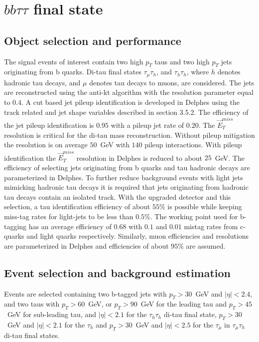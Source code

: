 \section{$bb\tau\tau$ final state}

\subsection{Object selection and performance}
The signal events of interest contain two high $p_{T}$ taus and two high $p_{T}$ jets originating from b quarks. Di-tau final states $\tau_{\mu}\tau_{h}$, and $\tau_{h}\tau_{h}$, where $h$ denotes hadronic tau decays, and $\mu$ denotes tau decays to muons, are considered.
The jets are reconstructed using the anti-kt algorithm with the resolution parameter equal to $0.4$. A cut based jet pileup identification is developed in Delphes using the track related and jet shape variables described in section 3.5.2. The efficiency of the jet pileup identification is $0.95$ with a pileup jet rate of $0.20$. The $\vec{E}_{T}^{miss}$ resolution is critical for the di-tau mass reconstruction. Without pileup mitigation the resolution is on average $50$~GeV with $140$ pileup interactions. With pileup identification the  $\vec{E}_{T}^{miss}$ resolution in Delphes is reduced to about $25$~GeV. 
The efficiency of selecting jets originating from b quarks and tau hadronic decays are parameterized in Delphes. To further reduce background events with light jets mimicking hadronic
tau decays it is required that jets originating from hadronic tau decays contain an isolated track. With the upgraded \phasetwo detector and this selection, a tau identification efficiency of about $55\%$ is possible while keeping miss-tag rates for light-jets to be less than $0.5\%$. The working point used for b-tagging has an average efficiency of $0.68$ with $0.1$ and $0.01$ mistag rates from c-quarks and light quarks respectively.  Similarly, muon efficiencies and resolutions are parameterized in Delphes and efficiencies of about $95\%$ are assumed.

\subsection{Event selection and background estimation}
Events are selected containing two b-tagged jets with $p_{T}>30$~GeV
and $|\eta|<2.4$, and two taus with $p_{T}>60$~GeV, or $p_{T}>90$~GeV
for the leading tau and $p_{T}>45$~GeV for sub-leading tau, and
$|\eta|<2.1$ for the $\tau_{h}\tau_{h}$ di-tau final state, $p_{T}>30$~GeV
and $|\eta|<2.1$  for the $\tau_{h}$ and $p_{T}>30$~GeV and $|\eta|<2.5$
for the $\tau_{\mu}$ in $\tau_{\mu}\tau_{h}$ di-tau final states. 

